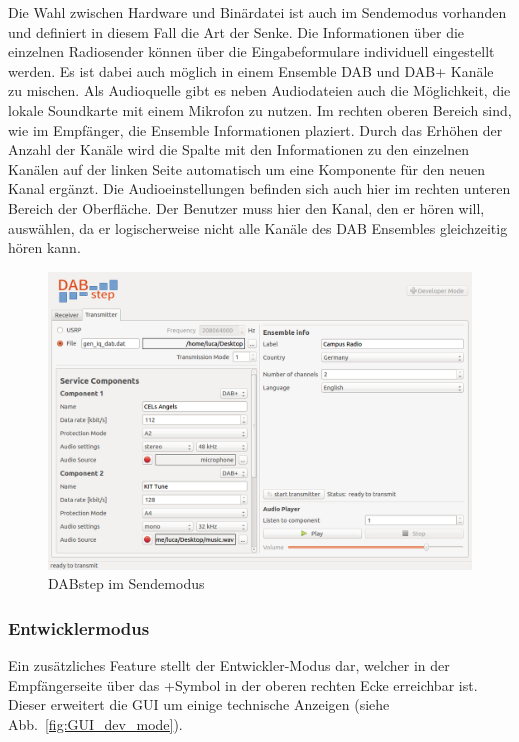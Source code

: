 Die Wahl zwischen Hardware und Binärdatei ist auch im Sendemodus vorhanden und definiert in diesem Fall die Art der Senke. Die Informationen über die einzelnen Radiosender können über die Eingabeformulare individuell eingestellt werden. Es ist dabei auch möglich in einem Ensemble DAB und DAB+ Kanäle zu mischen. Als Audioquelle gibt es neben Audiodateien auch die Möglichkeit, die lokale Soundkarte mit einem Mikrofon zu nutzen.
Im rechten oberen Bereich sind, wie im Empfänger, die Ensemble Informationen plaziert. Durch das Erhöhen der Anzahl der Kanäle wird die Spalte mit den Informationen zu den einzelnen Kanälen auf der linken Seite automatisch um eine Komponente für den neuen Kanal ergänzt. Die Audioeinstellungen befinden sich auch hier im rechten unteren Bereich der Oberfläche. Der Benutzer muss hier den Kanal, den er hören will, auswählen, da er logischerweise nicht alle Kanäle des DAB Ensembles gleichzeitig hören kann.

\begin{figure}[htb]
\centering
  \includegraphics[width=\textwidth]{figures/GUI_transmitter.png}
	\caption{DABstep im Sendemodus}
	\label{fig:GUI_transmitter}
\end{figure}

\subsubsection{Entwicklermodus}
Ein zusätzliches Feature stellt der Entwickler-Modus dar, welcher in der Empfängerseite über das \dq +\dq  Symbol in der oberen rechten Ecke erreichbar ist. Dieser erweitert die GUI um einige technische Anzeigen (siehe Abb.~\ref{fig:GUI_dev_mode}). 


